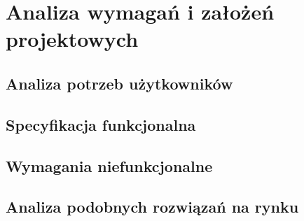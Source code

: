 %


\chapter{Analiza wymagań i założeń projektowych}
\label{rozdzial1}

\section{Analiza potrzeb użytkowników}

\section{Specyfikacja funkcjonalna}

\section{Wymagania niefunkcjonalne}

\section{Analiza podobnych rozwiązań na rynku}



